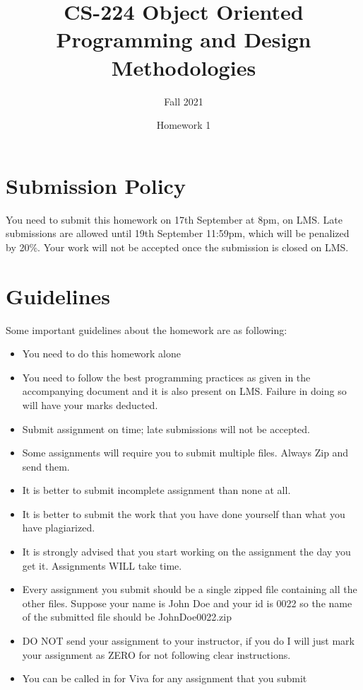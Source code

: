 \documentclass[a4paper,12pt]{article}
\begin{document}
\title{CS-224 Object Oriented Programming and Design Methodologies }
\author{Fall 2021}
\date{Homework 1}
\maketitle
\section{Submission Policy}
You need to submit this homework on  {\color{blue}17th September at 8pm}, on LMS. Late submissions are allowed until {\color{red} 19th September 11:59pm}, which will be penalized by 20\%. Your work will not be accepted once the submission is closed on LMS.

\section{Guidelines}
Some important guidelines about the homework are as following:
\begin{itemize}
	\item You need to do this homework alone

	\item You need to follow the best programming practices as given in the accompanying document and it is also present on LMS. Failure in doing so will have your marks deducted.
	\item Submit assignment on time; late submissions will not be accepted.
	\item Some assignments will require you to submit multiple files. Always Zip and send them.
	\item It is better to submit incomplete assignment than none at all.
	\item It is better to submit the work that you have done yourself than what you have plagiarized.
	\item It is strongly advised that you start working on the assignment the day you get it. Assignments WILL take time.
	\item Every assignment you submit should be a single zipped file containing all the other files. Suppose your name is John Doe and your id is 0022 so the name of the submitted file should be JohnDoe0022.zip
	\item DO NOT send your assignment to your instructor, if you do I will just mark your assignment as ZERO for not following clear instructions.
	\item You can be called in for Viva for any assignment that you submit
\end{itemize}
\end{document}
